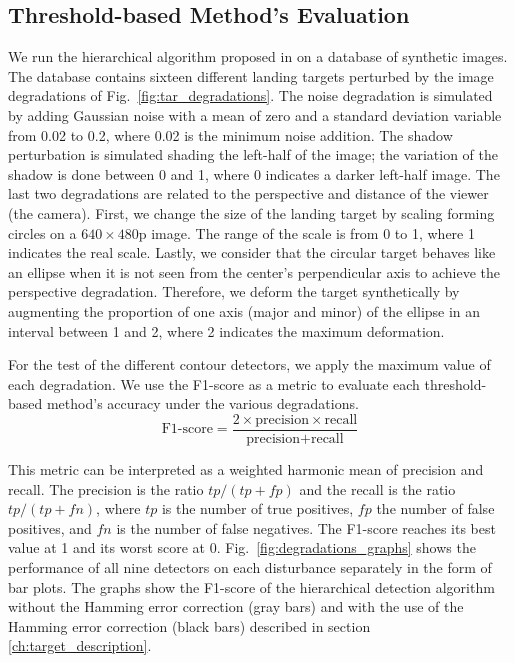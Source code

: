 \subsection{Threshold-based Method's Evaluation}
We run the hierarchical algorithm proposed in \citep{BaquedanoA.:ESIEE:2017} on a database of synthetic images. The database contains sixteen different landing targets perturbed by the image degradations of Fig.\ \ref{fig:tar_degradations}. The noise degradation is simulated by adding Gaussian noise with a mean of zero and a standard deviation variable from 0.02 to 0.2, where 0.02 is the minimum noise addition. The shadow perturbation is simulated shading the left-half of the image; the variation of the shadow is done between 0 and 1, where 0 indicates a darker left-half image. The last two degradations are related to the perspective and distance of the viewer (the camera). First, we change the size of the landing target by scaling forming circles on a $640\times480$p image. The range of the scale is from 0 to 1, where 1 indicates the real scale. Lastly, we consider that the circular target behaves like an ellipse when it is not seen from the center's perpendicular axis to achieve the perspective degradation. Therefore, we deform the target synthetically by augmenting the proportion of one axis (major and minor) of the ellipse in an interval between 1 and 2, where 2 indicates the maximum deformation. 

For the test of the different contour detectors, we apply the maximum value of each degradation. We use the F1-score as a metric to evaluate each threshold-based method's accuracy under the various degradations.
\begin{equation}\label{eq:f1_score}
    \text{F1-score} = \frac{2 \times \text{precision}\times\text{recall}}{\text{precision} + \text{recall}}
\end{equation}

This metric can be interpreted as a weighted harmonic mean of precision and recall. The precision is the ratio $tp / (tp + fp)$ and the recall is the ratio $tp / (tp + fn)$, where $tp$ is the number of true positives, $fp$ the number of false positives, and $fn$ is the number of false negatives. The F1-score reaches its best value at 1 and its worst score at 0. Fig.\ \ref{fig:degradations_graphs} shows the performance of all nine detectors on each disturbance separately in the form of bar plots. The graphs show the F1-score of the hierarchical detection algorithm without the Hamming error correction (gray bars) and with the use of the Hamming error correction (black bars) described in section \ref{ch:target_description}.

